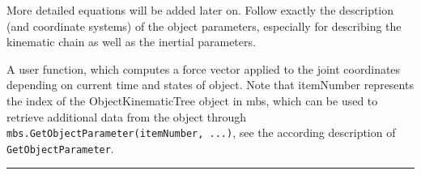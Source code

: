     More detailed equations will be added later on. Follow exactly the description (and coordinate systems) of the object parameters,
    especially for describing the kinematic chain as well as the inertial parameters.

    A user function, which computes a force vector applied to the joint coordinates depending on current time and states of object. 
    Note that itemNumber represents the index of the ObjectKinematicTree object in mbs, which can be used to retrieve additional data from the object through
    \texttt{mbs.GetObjectParameter(itemNumber, ...)}, see the according description of \texttt{GetObjectParameter}.
    \finishTable
    \vspace{12pt}
\vspace{6pt}\par\noindent\rule{\textwidth}{0.4pt}
\label{miniExample_ObjectKinematicTree}
\pythonstyle
